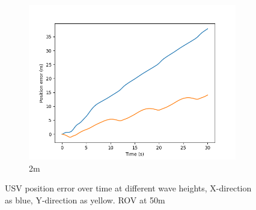 \documentclass[class=article, crop=false]{standalone}
\begin{document}
\begin{figure}
\begin{subfigure}[b]{0.48\textwidth}
        \includegraphics{scenario1/rov-50m/2.0m/usv_pos_error_uncontrolled}
        \caption{2m}
        \label{}
    \end{subfigure}
    \caption{USV position error over time at different wave heights, X-direction as blue, Y-direction as yellow. ROV at 50m}
    \label{}
\end{figure}
\end{document}
